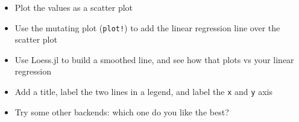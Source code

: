 \documentclass[11pt]{article}
\providecommand{\tightlist}{%
      \setlength{\itemsep}{0pt}\setlength{\parskip}{0pt}}
\begin{document}
\begin{itemize}
\tightlist
\item
  Plot the values as a scatter plot
\item
  Use the mutating plot (\texttt{plot!}) to add the linear regression
  line over the scatter plot
\item
  Use Loess.jl to build a smoothed line, and see how that plots vs your
  linear regression
\item
  Add a title, label the two lines in a legend, and label the \texttt{x}
  and \texttt{y} axis
\item
  Try some other backends: which one do you like the best?
\end{itemize}


    
    
    
    
\end{document}
